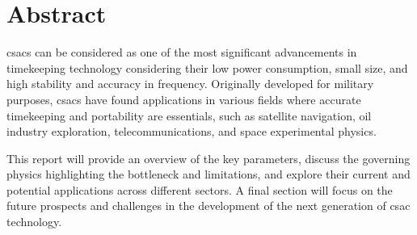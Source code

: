 



\section*{Abstract}

\acrfull{csacs} can be considered as one of the most significant advancements in timekeeping technology considering their low power consumption, small size, and high stability and accuracy in frequency.
Originally developed for military purposes, \acrshort{csacs} have found applications in various fields where accurate timekeeping and portability are essentials, such as satellite navigation, oil industry exploration, telecommunications, and space experimental physics.

This report will provide an overview of the key parameters, discuss the governing physics highlighting the bottleneck and limitations, and explore their current and potential applications across different sectors.
A final section will focus on the future prospects and challenges in the development of the next generation of \acrshort{csac} technology.

\vspace{1cm}

